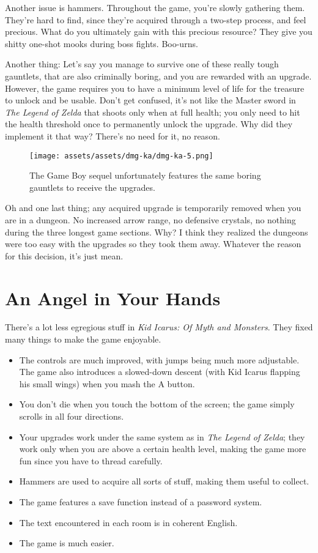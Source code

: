 \documentclass{book}
\begin{document}
Another issue is hammers. Throughout the game, you’re slowly gathering them. They’re hard to find, since they’re acquired through a two-step process, and feel precious. What do you ultimately gain with this precious resource? They give you shitty one-shot mooks during boss fights. Boo-urns.

Another thing: Let’s say you manage to survive one of these really tough gauntlets, that are also criminally boring, and you are rewarded with an upgrade. However, the game requires you to have a minimum level of life for the treasure to unlock and be usable. Don’t get confused, it’s not like the Master sword in \emph{The Legend of Zelda} that shoots only when at full health; you only need to hit the health threshold once to permanently unlock the upgrade. Why did they implement it that way? There’s no need for it, no reason.

\begin{figure}[hbt]
\vskip 10pt
\centering \texttt{[image: assets/assets/dmg-ka/dmg-ka-5.png]}\par\pagetwodescription The Game Boy sequel unfortunately features the same boring gauntlets to receive the upgrades.
\vskip 6pt
\end{figure}

Oh and one last thing; any acquired upgrade is temporarily removed when you are in a dungeon. No increased arrow range, no defensive crystals, no nothing during the three longest game sections. Why? I think they realized the dungeons were too easy with the upgrades so they took them away. Whatever the reason for this decision, it’s just mean.

\FloatBarrier\needspace{10mm}\section*{An Angel in Your Hands}\nopagebreak[4]

There’s a lot less egregious stuff in \emph{Kid Icarus: Of Myth and Monsters}. They fixed many things to make the game enjoyable.

\begin{itemize} [nosep]
\item The controls are much improved, with jumps being much more adjustable. The game also introduces a slowed-down descent (with Kid Icarus flapping his small wings) when you mash the A button.
\item You don’t die when you touch the bottom of the screen; the game simply scrolls in all four directions.
\item Your upgrades work under the same system as in \emph{The Legend of Zelda}; they work only when you are above a certain health level, making the game more fun since you have to thread carefully.
\item Hammers are used to acquire all sorts of stuff, making them useful to collect.
\item The game features a save function instead of a password system.
\item The text encountered in each room is in coherent English.
\item The game is much easier.
\end{itemize}\noindent
\end{document}
